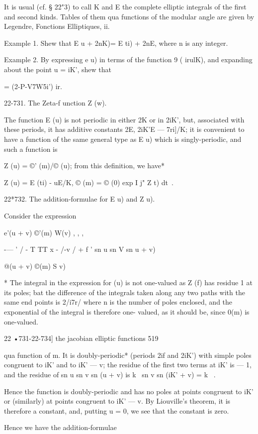 It is usual (cf. § 22"3) to call K and E the complete elliptic
integrals of the first and second kinds. Tables of them qua functions
of the modular angle are given by Legendre, Fonctions Elliptiques, ii.

Example 1. Shew that E u + 2nK)= E ti) + 2nE, where n is any integer.

Example 2. By expressing e u) in terms of the function 9 ( irulK), and
expanding about the point u = iK', shew that

 = (2-P-V7W5i') ir.

22-731. The Zeta-f unction Z (w).

The function E (u) is not periodic in either 2K or in 2iK', but,
associated with these periods, it has additive constants 2E, 2iK'E —
7ri]/K; it is convenient to have a function of the same general type
as E u) which is singly-periodic, and such a function is

Z (u) = ©' (m)/© (u); from this definition, we have*

Z (u) = E (ti) - uE/K, © (m) = © (0) exp I j" Z t) dt\ .

22*732. The addition-formulae for E u) and Z u).

Consider the expression

e'(u + v) ©'(m) W(v) , , ,

-— ' / - T TT x - /-v / + f ' sn u sn V sn u + v)

@(u + v) ©(m) S v)

* The integral in the expression for (u) is not one-valued as Z (f)
has residue 1 at its poles; bat the difference of the integrals taken
along any two paths with the same end points is 2/i7r/ where n is the
number of poles enclosed, and the exponential of the integral is
therefore one- valued, as it should be, since 0(m) is one-valued.

22 •731-22-734] the jacobian elliptic functions 519

qua function of m. It is doubly-periodic* (periods 2if and 2iK') with
simple poles congruent to iK' and to iK' — v; the residue of the
first two terms at iK' is — 1, and the residue of sn u sn v sn (u + v)
is k~ sn v sn (iK' + v) = k~ .

Hence the function is doubly-periodic and has no poles at points
congruent to iK' or (similarly) at points congruent to iK' — v. By
Liouville's theorem, it is therefore a constant, and, putting u = 0,
we see that the constant is zero.

Hence we have the addition-formulae

